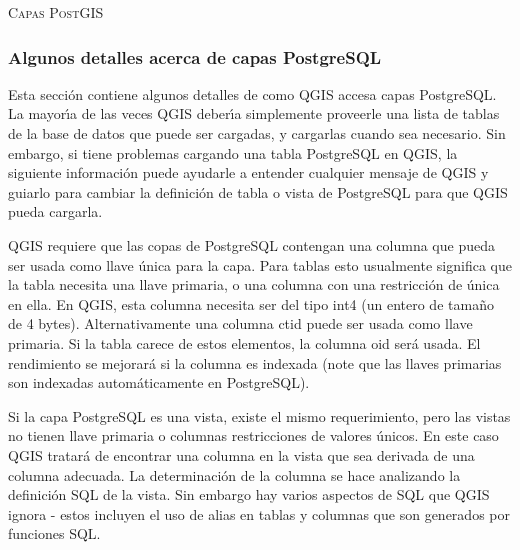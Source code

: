 \begin{Tip}\caption{\textsc{Capas PostGIS}}
\end{Tip}

\subsubsection{Algunos detalles acerca de capas PostgreSQL}\label{sec:postgis_details}

Esta secci\'on contiene algunos detalles de como QGIS accesa capas PostgreSQL. La mayor\'{\i}a de las veces QGIS deber\'{\i}a simplemente proveerle una lista de tablas de la base de datos que puede ser cargadas, y cargarlas cuando sea necesario. Sin embargo, si tiene problemas cargando una tabla PostgreSQL en QGIS, la siguiente informaci\'on puede ayudarle a entender cualquier mensaje de QGIS y guiarlo para cambiar la definici\'on de tabla o vista de PostgreSQL para que QGIS pueda cargarla.

QGIS requiere que las copas de PostgreSQL contengan una columna que pueda ser usada como llave \'unica para la capa. Para tablas esto usualmente significa que la tabla necesita una llave primaria, o una columna con una restricci\'on de \'unica en ella. En QGIS, esta columna necesita ser del tipo int4 (un entero de tama\~no de 4 bytes). Alternativamente una columna ctid puede ser usada como llave primaria. Si la tabla carece de estos elementos, la columna oid ser\'a usada. El rendimiento se mejorar\'a si la columna es indexada (note que las llaves primarias son indexadas autom\'aticamente en PostgreSQL). 

Si la capa PostgreSQL es una vista, existe el mismo requerimiento, pero las vistas no tienen llave primaria o columnas restricciones de valores \'unicos. En este caso QGIS tratar\'a de encontrar una columna en la vista que sea derivada de una columna adecuada. La determinaci\'on de la columna se hace analizando la definici\'on SQL de la vista. Sin embargo hay varios aspectos de SQL que QGIS ignora - estos incluyen el uso de alias en tablas y columnas que son generados por funciones SQL.

